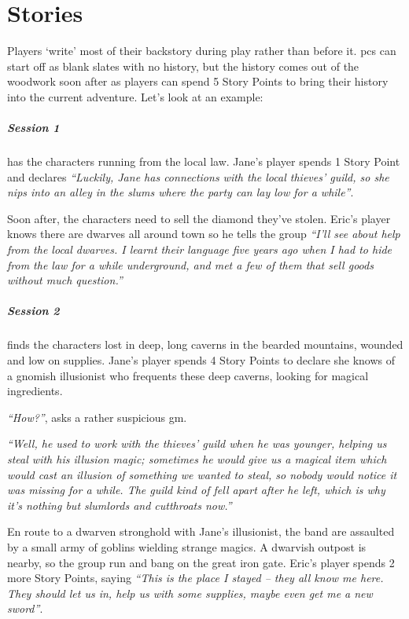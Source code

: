\documentclass[titlepage,a4paper,openany]{book}
\begin{document}
\chapter{Stories}\label{stories}

\begin{multicols}{2}

Players `write' most of their backstory during play rather than before it.  \Glspl{pc} can start off as blank slates with no history, but the history comes out of the woodwork soon after as players can spend 5 Story Points to bring their history into the current adventure.  Let's look at an example:

\paragraph{Session 1} has the characters running from the local law.  Jane's player spends 1 Story Point and declares \textit{``Luckily, Jane has connections with the local thieves' guild, so she nips into an alley in the slums where the party can lay low for a while''}.

Soon after, the characters need to sell the diamond they've stolen.  Eric's player knows there are dwarves all around town so he tells the group \textit{``I'll see about help from the local dwarves.  I learnt their language five years ago when I had to hide from the law for a while underground, and met a few of them that sell goods without much question.''}

\paragraph{Session 2} finds the characters lost in deep, long caverns in the bearded mountains, wounded and low on supplies.  Jane's player spends 4 Story Points to declare she knows of a gnomish illusionist who frequents these deep caverns, looking for magical ingredients.

\textit{``How?''}, asks a rather suspicious \gls{gm}.

\textit{``Well, he used to work with the thieves' guild when he was younger, helping us steal with his illusion magic; sometimes he would give us a magical item which would cast an illusion of something we wanted to steal, so nobody would notice it was missing for a while.
The guild kind of fell apart after he left, which is why it's nothing but slumlords and cutthroats now.''}

En route to a dwarven stronghold with Jane's illusionist, the band are assaulted by a small army of goblins wielding strange magics.
A dwarvish outpost is nearby, so the group run and bang on the great iron gate.  Eric's player spends 2 more Story Points, saying \textit{``This is the place I stayed -- they all know me here.  They should let us in, help us with some supplies, maybe even get me a new sword''}.


\end{multicols}
\end{document}
